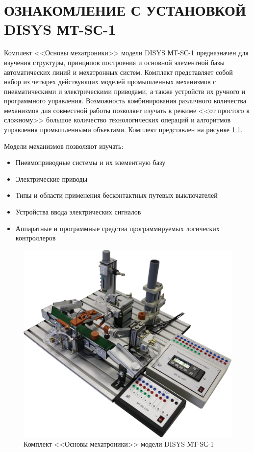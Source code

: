\chapter{ОЗНАКОМЛЕНИЕ С УСТАНОВКОЙ DISYS МТ-SС-1}
Комплект <<Основы мехатроники>> модели DISYS МТ-SС-1 предназначен для изучения структуры, принципов построения и основной элементной базы автоматических линий и мехатронных систем.
Комплект представляет собой набор из четырех действующих моделей промышленных механизмов с пневматическими и электрическими приводами, а также устройств их ручного и программного управления.
Возможность комбинирования различного количества механизмов для совместной работы позволяет изучать в режиме <<от простого к сложному>> большое количество технологических операций и алгоритмов управления промышленными объектами. Комплект представлен на рисунке \ref{fig:all}.

Модели механизмов позволяют изучать:
\begin{itemize}
    \item Пневмоприводные системы и их элементную базу
    \item Электрические приводы
    \item Типы и области применения бесконтактных путевых выключателей
    \item Устройства ввода электрических сигналов
    \item Аппаратные и программные средства программируемых логических контроллеров
\end{itemize}


\begin{figure}[hb]
    \centering
    \includegraphics[scale=0.30]{fig/2.1.png}
    \caption{Комплект <<Основы мехатроники>> модели DISYS МТ-SС-1}
    \label{fig:all}
\end{figure}

